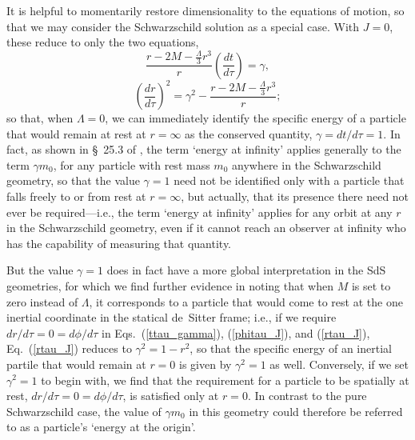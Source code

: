 It is helpful to momentarily restore dimensionality to the equations of motion, so that we may consider the Schwarzschild solution as a special case. With $J=0$, these reduce to only the two equations,
\begin{equation}
\frac{r-2M-\frac{\Lambda}{3}r^3}{r}\left(\frac{dt}{d\tau}\right)=\gamma,\label{ttau_gammaLambda}
\end{equation}
\begin{equation}
\left(\frac{dr}{d\tau}\right)^2=\gamma^2-\frac{r-2M-\frac{\Lambda}{3}r^3}{r};\label{rtau_Lambda}
\end{equation}
so that, when $\Lambda=0$, we can immediately identify the specific energy of a particle that would remain at rest at $r=\infty$ as the conserved quantity, $\gamma=dt/d\tau=1$. In fact, as shown in \S~25.3 of \cite{Misner1973}, the term `energy at infinity' applies generally to the term $\gamma{m_0}$, for any particle with rest mass $m_0$ anywhere in the Schwarzschild geometry, so that the value $\gamma=1$ need not be identified only with a particle that falls freely to or from rest at $r=\infty$, but actually, that its presence there need not ever be required---i.e., the term `energy at infinity' applies for any orbit at any $r$ in the Schwarzschild geometry, even if it cannot reach an observer at infinity who has the capability of measuring that quantity. 

But the value $\gamma=1$ does in fact have a more global interpretation in the SdS geometries, for which we find further evidence in noting that when $M$ is set to zero instead of $\Lambda$, it corresponds to a particle that would come to rest at the one inertial coordinate in the statical de~Sitter frame; i.e., if we require $dr/d\tau=0=d\phi/d\tau$ in Eqs.~(\ref{ttau_gamma}), (\ref{phitau_J}), and (\ref{rtau_J}), Eq.~(\ref{rtau_J}) reduces to $\gamma^2=1-r^2$, so that the specific energy of an inertial partile that would remain at $r=0$ is given by $\gamma^2=1$ as well. Conversely, if we set $\gamma^2=1$ to begin with, we find that the requirement for a particle to be spatially at rest, $dr/d\tau=0=d\phi/d\tau$, is satisfied only at $r=0$. In contrast to the pure Schwarzschild case, the value of $\gamma{m_0}$ in this geometry could therefore be referred to as a particle's `energy at the origin'.

